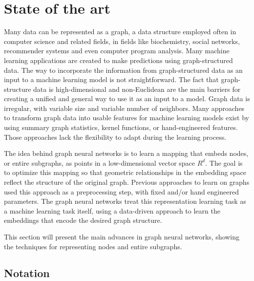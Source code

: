 \section{State of the art}



Many data can be represented as a graph, a data structure employed often in computer science and related fields, in fields like biochemistry, social networks, recommender systems and even computer program analysis. Many machine learning applications are created to make predictions using graph-structured data. The way to incorporate the information from graph-structured data as an input to a machine learning model is not straightforward. The fact that graph-structure data is high-dimensional and non-Euclidean are the main barriers for creating a unified and general way to use it as an input to a model. Graph data is irregular, with variable size and variable number of neighbors. Many approaches to transform graph data into usable features for machine learning models exist by using summary graph statistics, kernel functions, or hand-engineered features. Those approaches lack the flexibility to adapt during the learning process.



The idea behind graph neural networks is to learn a mapping that embeds nodes, or entire subgraphs, as points in a low-dimensional vector space $R^d$. The goal is to optimize this mapping so that geometric relationships in the embedding space reflect the structure of the original graph. Previous approaches to learn on graphs used this approach as a preprocessing step, with fixed and/or hand engineered parameters. The graph neural networks treat this representation learning task as a machine learning task itself, using a data-driven approach to learn the embeddings that encode the desired graph structure.

This section will present the main advances in graph neural networks, showing the techniques for representing nodes and entire subgraphs.

\subsection{Notation}


